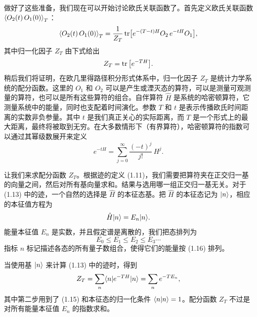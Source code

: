 做好了这些准备，我们现在可以开始讨论欧氏关联函数了。首先定义欧氏关联函数 $\left\langle O_2(t)\,O_1(0) \right\rangle_T$：
\begin{equation}
  \left\langle O_2(t)\,O_1(0) \right\rangle_T
  = \frac{1}{Z_T}\operatorname{tr}\!\big[e^{-(T-t)H}O_2\,e^{-tH}O_1\big],
\end{equation}
其中归一化因子 $Z_T$ 由下式给出
\begin{equation}
  Z_T = \operatorname{tr}\big[e^{-TH}\big].
\end{equation}
稍后我们将证明，在欧几里得路径积分形式体系中，归一化因子 $Z_T$ 是统计力学系统的配分函数。这里的 $O_1$ 和 $O_2$ 可以是产生或湮灭态的算符，可以是测量可观测量的算符，也可以是所有这些算符的组合。自伴算符 $\hat{H}$ 是系统的哈密顿算符，它测量系统中的能量，同时也支配着时间演化。参数 $T$ 和 $t$ 是表示传播欧氏时间距离的实数非负参量。其中 $t$ 是我们真正关心的实际距离，而 $T$ 是一个形式上的最大距离，最终将被取到无穷。在大多数情形下（有界算符），哈密顿算符的指数可以通过其幂级数展开来定义
\begin{equation}
  e^{-tH} = \sum_{j=0}^{\infty}\frac{(-t)^j}{j!}\,H^j.
\end{equation}

让我们来求配分函数 $Z_T$。根据迹的定义 (1.11)，我们需要把算符夹在正交归一基的向量之间，然后对所有基向量求和。结果与选用哪一组正交归一基无关。对于 (1.13) 中的迹，一个自然的选择是 $\hat{H}$ 的本征态基。把 $\hat{H}$ 的本征态记为 $|n\rangle$，相应的本征值方程为
\begin{equation}
  \hat{H}|n\rangle = E_n|n\rangle.
\end{equation}
能量本征值 $E_n$ 是实数，并且假定谱是离散的，我们把态排列为
\begin{equation}
  E_0 \leq E_1 \leq E_2 \leq E_3 \cdots
\end{equation}
指标 $n$ 标记描述各态的所有量子数组合，使得它们的能量按 (1.16) 排列。

当使用基 $|n\rangle$ 来计算 (1.13) 中的迹时，得到
\begin{equation}
  Z_T = \sum_n \langle n|e^{-TH}|n\rangle = \sum_n e^{-TE_n},
\end{equation}
其中第二步用到了 (1.15) 和本征态的归一化条件 $\langle n|n\rangle = 1$。配分函数 $Z_T$ 不过是对所有能量本征值 $E_n$ 的指数求和。

